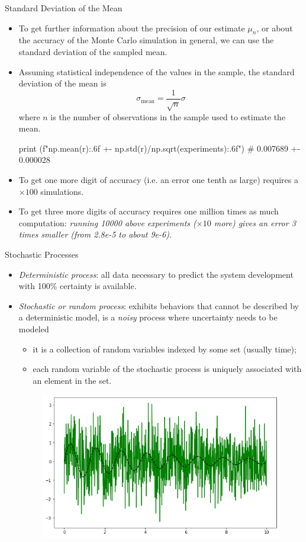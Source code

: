 \documentclass{beamer}
\begin{document}
\begin{frame}[fragile]{Standard Deviation of the Mean}
\begin{itemize}
\item To get further information about the precision of our estimate $\mu_n$, or about the accuracy of the Monte Carlo simulation in general, we can use the standard deviation of the sampled mean. 
\item Assuming statistical independence of the values in the sample, the standard deviation of the mean is 
\begin{equation*}
\sigma _{\text{mean}}={\frac {1}{\sqrt {n}}}\sigma
\end{equation*}
where $n$ is the number of observations in the sample used to estimate the mean. 

\begin{ipython}
print (f"{np.mean(r):.6f} +- {np.std(r)/np.sqrt(experiments):.6f}")
# 0.007689 +- 0.000028
\end{ipython}
\item To get one more digit of accuracy (i.e. an error one tenth as large) requires a $\times100$ simulations.
\item To get three more digits of accuracy requires one million times as much computation: \emph{running 10000 above experiments ($\times10$ more) gives an error 3 times smaller (from 2.8e-5 to about 9e-6)}.
\end{itemize}
\end{frame}

\begin{frame}{Stochastic Processes}
\begin{itemize}
\item \emph{Deterministic process}: all data necessary to predict the system development with 100\% certainty is available.
\item \emph{Stochastic or random process}: exhibits behaviors that cannot be described by a deterministic model, is a \emph{noisy} process where uncertainty needs to be modeled
   \begin{itemize}
    \item it is a collection of random variables indexed by some set (usually time);
    \item each random variable of the stochastic process is uniquely associated with an element in the set. 
    \end{itemize}
\begin{figure}[h]
    \begin{center}
    \includegraphics[width=0.5\linewidth]{stochastic_process}
    \end{center}
\end{figure}        
\end{itemize}
\end{frame}
\end{document}
